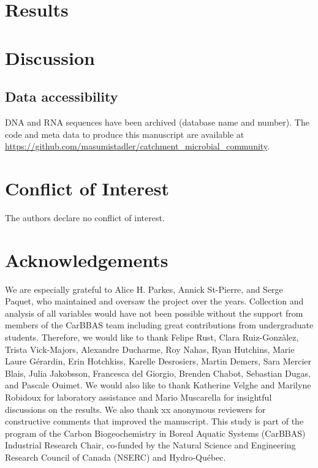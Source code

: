 \documentclass[12pt,a4paper]{article} %
\begin{document}
\section*{Results}

\section*{Discussion}

\subsection*{Data accessibility}
DNA and RNA sequences have been archived (database name and number). The code and meta data to produce this manuscript are available at \url{https://github.com/masumistadler/catchment_microbial_community}. \\

\section*{Conflict of Interest}
The authors declare no conflict of interest.

\section*{Acknowledgements}
We are especially grateful to Alice H. Parkes, Annick St-Pierre, and Serge Paquet, who maintained and oversaw the project over the years. Collection and analysis of all variables would have not been possible without the support from members of the CarBBAS team including great contributions from undergraduate students. Therefore, we would like to thank Felipe Rust, Clara Ruiz-Gonz\`{a}lez, Trista Vick-Majors, Alexandre Ducharme, Roy Nahas, Ryan Hutchins, Marie Laure G\'{e}rardin,  Erin Hotchkiss, Karelle Desrosiers, Martin Demers, Sara Mercier Blais, Julia Jakobsson, Francesca del Giorgio, Brenden Chabot, Sebastian Dugas, and Pascale Ouimet. We would also like to thank Katherine Velghe and Marilyne Robidoux for laboratory assistance and Mario Muscarella for insightful discussions on the results. We also thank xx anonymous reviewers for constructive comments that improved the manuscript. This study is part of the program of the Carbon Biogeochemistry in Boreal Aquatic Systems (CarBBAS) Industrial Research Chair, co-funded by the Natural Science and Engineering Research Council of Canada (NSERC) and Hydro-Qu\'{e}bec.

\newpage
\singlespacing
\end{document}

